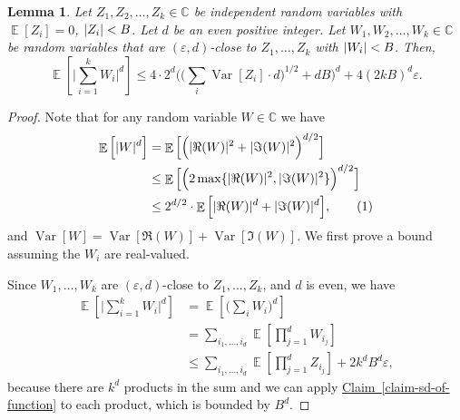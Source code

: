 \documentclass[11pt]{article}
\numberwithin{equation}{section}
\newtheorem{lemma}[theorem]{Lemma}
\theoremstyle{definition}
\theoremstyle{plain}
\newcommand{\C}{\mathbb C}
\newcommand{\expref}[2]{\hyperref[#2]{#1~\ref{#2}}}
\def\eps{\varepsilon}
\DeclarePairedDelimiter{\abs}{\lvert}{\rvert}
\DeclareMathOperator*{\E}{\mathbb{E}}                 %
\DeclareMathOperator*{\Var}{Var}                 %
\newcommand\numberthis{\addtocounter{equation}{1}\tag{\theequation}}
\begin{document}
  \begin{lemma} \label{lemma:moments}
    Let $Z_1, Z_2, \ldots, Z_k \in \C$ be independent random variables with $\E[Z_i] = 0$, $\abs{Z_i} < B$.
    Let $d$ be an even positive integer.
    Let $W_1, W_2, \ldots, W_k \in \C$ be random variables that are $(\eps, d)$-close to $Z_1, \ldots, Z_k$ with $\abs{W_i} < B$.
    Then,
    \[
      \E \left[ \Big| \sum_{i = 1}^k W_i \Big|^d \right]
      \le 4 \cdot 2^d \Big( \Big( \sum_i \Var[Z_i] \cdot d \Big)^{1/2} + d B \Big)^d + 4 (2kB)^d \eps.
    \]
  \end{lemma}

  \begin{proof}
    Note that for any random variable $W \in \C$ we have
    \begin{align*}
      \E \Big[ \abs{W}^d \Big]
      &= \E \Big[ \Big( \abs{\Re(W)}^2 + \abs{\Im(W)}^2 \Big)^{d/2} \Big] \\
      &\le \E \Big[ \Big( 2 \max\{ \abs{\Re(W)}^2, \abs{\Im(W)}^2 \} \Big)^{d/2} \Big] \\
      &\le 2^{d/2} \cdot \E \Big[ \abs{\Re(W)}^d + \abs{\Im(W)}^d \Big] , \numberthis \label{eq:complex-decompose}
    \end{align*}
    and $\Var[W] = \Var[\Re(W)] + \Var[\Im(W)]$.  
    We first prove a bound assuming the $W_i$ are real-valued.

    Since $W_1, \ldots, W_k$ are $(\eps, d)$-close to $Z_1, \ldots, Z_k$, and $d$ is even, we have
    \begin{align*}
      \E \left[ \Big| \sum_{i = 1}^k W_i \Big|^d \right]
      &= \E \left[ \Big( \sum_i W_i \Big)^d \right] \\
      &= \sum_{i_1, \ldots, i_d} \E \left[ \prod_{j = 1}^d W_{i_j} \right] \\
      &\le \sum_{i_1, \ldots, i_d} \E \left[ \prod_{j = 1}^d Z_{i_j} \right] + 2 k^d B^d \eps ,
    \end{align*}
    because there are $k^d$ products in the sum and we can apply \expref{Claim}{claim-sd-of-function} to each product, which is bounded by $B^d$.


\end{proof}
\end{document}
